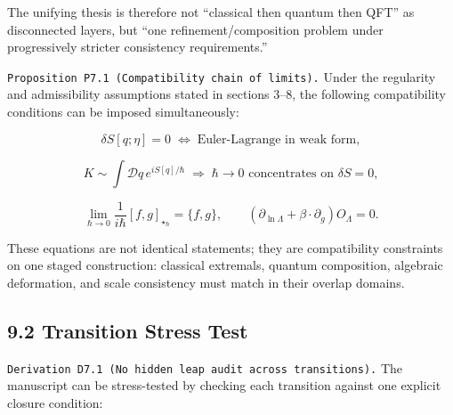 \documentclass[
]{article}
\begin{document}
The unifying thesis is therefore not ``classical then quantum then QFT''
as disconnected layers, but ``one refinement/composition problem under
progressively stricter consistency requirements.''

\texttt{Proposition\ P7.1\ (Compatibility\ chain\ of\ limits).} Under
the regularity and admissibility assumptions stated in sections 3--8,
the following compatibility conditions can be imposed simultaneously:

\[
\delta S[q;\eta]=0
\;\Longleftrightarrow\;
\text{Euler-Lagrange in weak form},
\]

\[
K \sim \int \mathcal Dq\,e^{iS[q]/\hbar}
\;\Longrightarrow\;
\hbar\to 0 \text{ concentrates on } \delta S=0,
\]

\[
\lim_{\hbar\to 0}\frac{1}{i\hbar}[f,g]_{\star_\hbar}=\{f,g\},
\qquad
\left(\partial_{\ln\Lambda}+\beta\cdot\partial_g\right)O_\Lambda=0.
\]

These equations are not identical statements; they are compatibility
constraints on one staged construction: classical extremals, quantum
composition, algebraic deformation, and scale consistency must match in
their overlap domains.

\subsection{9.2 Transition Stress Test}\label{transition-stress-test}

\texttt{Derivation\ D7.1\ (No\ hidden\ leap\ audit\ across\ transitions).}
The manuscript can be stress-tested by checking each transition against
one explicit closure condition:
\end{document}
